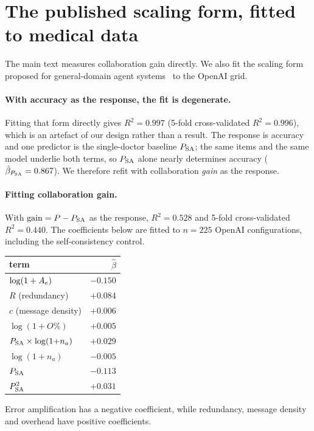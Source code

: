 \section{The published scaling form, fitted to medical data}
\label{app:scaling}

The main text measures collaboration gain directly. We also fit the scaling form proposed for
general-domain agent systems~\citep{kim2026scaling} to the OpenAI grid.

\paragraph{With accuracy as the response, the fit is degenerate.}
Fitting that form directly gives $R^2 = 0.997$ (5-fold
cross-validated $R^2 = 0.996$), which is an artefact of our design rather than a result. The
response is accuracy and one predictor is the single-doctor baseline $P_{\mathrm{SA}}$; the same items and
the same model underlie both terms, so $P_{\mathrm{SA}}$ alone nearly determines accuracy
($\hat\beta_{P_{\mathrm{SA}}} = 0.867$). We therefore refit with collaboration
\emph{gain} as the response.

\paragraph{Fitting collaboration gain.}
With $\mathrm{gain} = P - P_{\mathrm{SA}}$ as the response, $R^2 = 0.528$ and 5-fold cross-validated
$R^2 = 0.440$. The coefficients below are fitted to $n = 225$ OpenAI configurations,
including the self-consistency control.

\begin{center}\footnotesize
\setlength{\tabcolsep}{4pt}
\begin{tabular}{@{}lr@{}}
\toprule
term & $\hat\beta$ \\
\midrule
$\log(1+A_{e})$ & $-0.150$ \\
$R$ (redundancy) & $+0.084$ \\
$c$ (message density) & $+0.006$ \\
$\log(1+O\%)$ & $+0.005$ \\
$P_{\mathrm{SA}} \times \log(1{+}n_a)$ & $+0.029$ \\
$\log(1+n_a)$ & $-0.005$ \\
$P_{\mathrm{SA}}$ & $-0.113$ \\
$P_{\mathrm{SA}}^2$ & $+0.031$ \\
\bottomrule
\end{tabular}
\end{center}

\noindent Error amplification has a negative coefficient, while redundancy, message density and
overhead have positive coefficients.

